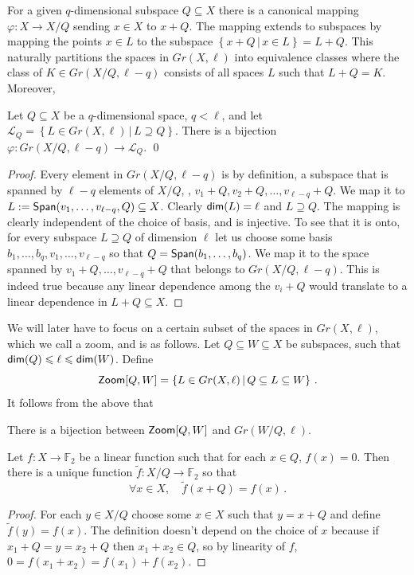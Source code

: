 \documentclass{toc}
\newcommand\Set[2]{ \left\{ #1 \,  \vert  \, #2\right\} }
\newcommand\spn{{\sf Span}}
\newcommand*\dimm{{\sf dim}}
\renewcommand\le{\leqslant}
\renewcommand\subset{\subseteq}
\renewcommand\supset{\supseteq}
\newcommand{\Zoom}{{\sf Zoom}}
\def\L{\mathcal{L}}
\def\F{\mathbb{F}}
\def\L{\mathcal{L}}
\begin{document}
For a given $q$-dimensional subspace $Q\subset X$ there is a canonical mapping $\varphi:X\to X/Q$ sending $x\in X$ to $x+Q$. The mapping extends to subspaces by mapping the points $x\in L$ to the subspace $\Set{ x+Q}{x\in L} = L+Q$. This naturally partitions the spaces in $Gr(X,\ell)$ into equivalence classes where the class of $ K \in Gr(X/Q,\ell-q)$ consists of all spaces $L$ such that $L+Q= K$.
%
Moreover,
\begin{claim}
Let $Q\subset X$ be a $q$-dimensional space, $q<\ell$, and let $\L_Q = \Set{ L \in Gr(X,\ell) }{ L\supset Q}$. There is a bijection $\varphi: Gr(X/Q,\ell-q)\to \L_Q$.
\qed
\end{claim}
\begin{proof}
Every element in $Gr(X/Q,\ell-q)$ is by definition, a subspace that is spanned by $\ell-q$ elements of $X/Q$, \eg, $v_1 + Q, v_2+Q, \ldots, v_{\ell-q}+Q$. We map it to $L := \spn (v_1,\ldots,v_{\ell-q},Q)\subset X$. Clearly $\dimm(L)=\ell$ and $L\supset Q$. The mapping is clearly independent of the choice of basis, and is injective. To see that it is onto, for every subspace $L\supset Q$ of dimension $\ell$ let us choose some basis $b_1,\ldots,b_q,v_1,\ldots,v_{\ell-q}$ so that $Q = \spn(b_1,\ldots,b_q)$. We map it to the space spanned by $v_1+Q,\ldots,v_{\ell-q}+Q$ that belongs to $Gr(X/Q,\ell-q)$. This is indeed true because any linear dependence among the $v_i+Q$ would translate to a linear dependence in $L+Q\subset X$.
\end{proof}

We will later have to focus on a certain subset of the spaces in $Gr(X,\ell)$, which we call a zoom, and is as follows. Let $Q\subset W \subset X$ be subspaces, such that $\dimm(Q) \le \ell \le \dimm(W)$. Define
\[ \Zoom[Q,W] = \Set{ L \in Gr(X,\ell) }{ Q\subset L \subset W}\,.
\]
It follows from the above that
\begin{claim}
There is a bijection between $\Zoom[Q,W]$ and $Gr(W/Q,\ell)$.
\end{claim}

\begin{claim}\label{claim:quotient-function}
Let $f:X\to\F_2$ be a linear function such that for each $x\in Q$, $f(x)=0$.
Then there is a unique function $\tilde f:X/Q\to\F_2$ so that
\[ \forall x\in X,\quad  \tilde f (x+Q) = f(x)\,. \]
\end{claim}
\begin{proof}
For each $y\in X/Q$ choose some $x\in X$ such that $y = x+Q$ and define $\tilde f(y) = f(x)$. The definition doesn't depend on the choice of $x$ because if $x_1+Q=y=x_2+Q$ then $x_1+x_2\in Q$, so by linearity of $f$, $0=f(x_1+x_2)=f(x_1)+f(x_2)$.
\end{proof}
\end{document}
